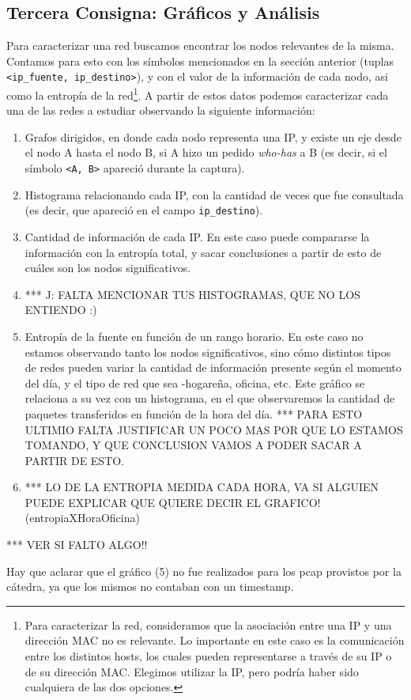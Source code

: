 \subsection{Tercera Consigna: Gr\'aficos y An\'alisis}

Para caracterizar una red buscamos encontrar los nodos relevantes de la misma. Contamos para esto con los s\'imbolos mencionados en la secci\'on anterior (tuplas \texttt{<ip\_fuente, ip\_destino>}), y con el valor de la informaci\'on de cada nodo, asi como la entrop\'ia de la red\footnote{Para caracterizar la red, consideramos que la asociaci\'on entre una IP y una direcci\'on MAC no es relevante. Lo importante en este caso es la comunicaci\'on entre los distintos hosts, los cuales pueden representarse a trav\'es de su IP o de su direcci\'on MAC. Elegimos utilizar la IP, pero podr\'ia haber sido cualquiera de las dos opciones.}. A partir de estos datos podemos caracterizar cada una de las redes a estudiar observando la siguiente informaci\'on:

\begin{enumerate}
 \item Grafos dirigidos, en donde cada nodo representa una IP, y existe un eje desde el nodo A hasta el nodo B, si A hizo un pedido \emph{who-has} a B (es decir, si el s\'imbolo \texttt{<A, B>} apareci\'o durante la captura).
 \item Histograma relacionando cada IP, con la cantidad de veces que fue consultada (es decir, que apareci\'o en el campo \texttt{ip\_destino}).
 \item Cantidad de informaci\'on de cada IP. En este caso puede compararse la informaci\'on con la entrop\'ia total, y sacar conclusiones a partir de esto de cu\'ales son los nodos significativos.
 \item *** J: FALTA MENCIONAR TUS HISTOGRAMAS, QUE NO LOS ENTIENDO :)
 \item Entrop\'ia de la fuente en funci\'on de un rango horario. En este caso no estamos observando tanto los nodos significativos, sino c\'omo distintos tipos de redes pueden variar la cantidad de informaci\'on presente seg\'un el momento del d\'ia, y el tipo de red que sea -hogare\~na, oficina, etc. Este gr\'afico se relaciona a su vez con un histograma, en el que observaremos la cantidad de paquetes transferidos en funci\'on de la hora del d\'ia. *** PARA ESTO ULTIMIO FALTA JUSTIFICAR UN POCO MAS POR QUE LO ESTAMOS TOMANDO, Y QUE CONCLUSION VAMOS A PODER SACAR A PARTIR DE ESTO.
 \item *** LO DE LA ENTROPIA MEDIDA CADA HORA, VA SI ALGUIEN PUEDE EXPLICAR QUE QUIERE DECIR EL GRAFICO! (entropiaXHoraOficina)
\end{enumerate}

*** VER SI FALTO ALGO!!

Hay que aclarar que el gr\'afico (5) no fue realizados para los pcap provistos por la c\'atedra, ya que los mismos no contaban con un timestamp.


